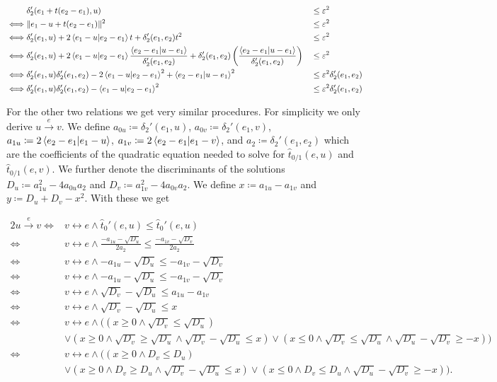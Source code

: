 \begin{alignat*}{3}
&\delta_2'(e_1 + t(e_2 - e_1), u) &&\leq \varepsilon^2 \\
  \iff& \|e_1 - u + t(e_2 - e_1)\|^2 &&\leq \varepsilon^2 \\
  \iff& \delta_2'(e_1, u) + 2\braket{e_1 - u | e_2 - e_1}t + \delta_2'(e_1, e_2)t^2 &&\leq \varepsilon^2 \\
  \iff& \delta_2'(e_1, u) + 2\braket{e_1 - u | e_2 - e_1}\frac{\braket{e_2 - e_1 | u - e_1}}{\delta_2'(e_1, e_2)} + \delta_2'(e_1, e_2)\left(\frac{\braket{e_2 - e_1 | u - e_1}}{\delta_2'(e_1, e_2)}\right) &&\leq \varepsilon^2 \\
  \iff& \delta_2'(e_1, u)\delta_2'(e_1, e_2) - 2\braket{e_1 - u | e_2 - e_1}^2 + \braket{e_2 - e_1 | u - e_1}^2 &&\leq \varepsilon^2 \delta_2'(e_1, e_2)\\
  \iff& \delta_2'(e_1, u)\delta_2'(e_1, e_2) - \braket{e_1 - u | e_2 - e_1}^2 &&\leq \varepsilon^2 \delta_2'(e_1, e_2)
\end{alignat*}

For the other two relations we get very similar procedures. For simplicity we only derive \(u \overset e\rightarrow v\). We define \(a_{0u} \coloneq \delta_2'(e_1, u)\), \(a_{0v} \coloneq \delta_2'(e_1, v)\), \(a_{1u} \coloneq 2\braket{e_2 - e_1 | e_1 - u}\), \(a_{1v} \coloneq 2\braket{e_2 - e_1 | e_1 - v}\), and \(a_{2} \coloneq \delta_2'(e_1, e_2)\) which are the coefficients of the quadratic equation needed to solve for \(\hat t_{0/1}(e, u)\) and \(\hat t_{0/1}(e, v)\). We further denote the discriminants of the solutions \(D_u \coloneq a_{1u}^2 - 4a_{0u}a_2\) and \(D_v \coloneq a_{1v}^2 - 4a_{0v}a_2\). We define \(x  \coloneq a_{1u} - a_{1v}\) and \(y \coloneq D_u + D_v - x^2\). With these we get 

\begin{alignat*}{2}
  u \overset e\rightarrow v \iff& v \leftrightarrow e \land \hat t_0'(e, u) \leq \hat t_0'(e, u) \\
  \iff& v \leftrightarrow e \land \frac{-a_{1u} - \sqrt{D_u}}{2a_2} \leq \frac{-a_{1v} - \sqrt{D_v}}{2a_2} \\
  \iff& v \leftrightarrow e \land -a_{1u} - \sqrt{D_u} \leq -a_{1v} - \sqrt{D_v} \\
  \iff& v \leftrightarrow e \land -a_{1u} - \sqrt{D_u} \leq -a_{1v} - \sqrt{D_v} \\
  \iff& v \leftrightarrow e \land \sqrt{D_v} - \sqrt{D_u} \leq a_{1u} - a_{1v}  \\
  \iff& v \leftrightarrow e \land \sqrt{D_v} - \sqrt{D_u} \leq x  \\
  \iff& v \leftrightarrow e \land ((x \geq 0 \land \sqrt{D_v} \leq \sqrt{D_u})\\ & \lor (x \geq 0 \land \sqrt{D_v} \geq \sqrt{D_u} \land \sqrt{D_v} - \sqrt{D_u} \leq x )\lor(x \leq 0 \land \sqrt{D_v} \leq \sqrt{D_u} \land \sqrt{D_u} - \sqrt{D_v} \geq -x ) )  \\
  \iff& v \leftrightarrow e \land ((x \geq 0 \land D_v \leq D_u)\\ & \lor (x \geq 0 \land D_v \geq D_u \land \sqrt{D_v} - \sqrt{D_u} \leq x )\lor(x \leq 0 \land D_v \leq D_u \land \sqrt{D_u} - \sqrt{D_v} \geq -x ) ).
\end{alignat*}

